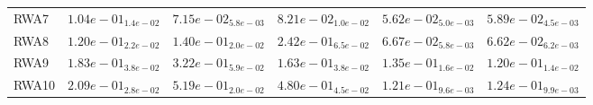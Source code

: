 \documentclass{article}
\begin{document}
\begin{table}
\begin{scriptsize}
\begin{tabular}{llllll}
RWA7 & $  1.04e-01_{ 1.4e-02}$ & $  7.15e-02_{ 5.8e-03}$ & $  8.21e-02_{ 1.0e-02}$ & \cellcolor{gray95}$  5.62e-02_{ 5.0e-03}$ & \cellcolor{gray25}$  5.89e-02_{ 4.5e-03}$ \\
RWA8 & $  1.20e-01_{ 2.2e-02}$ & $  1.40e-01_{ 2.0e-02}$ & $  2.42e-01_{ 6.5e-02}$ & \cellcolor{gray25}$  6.67e-02_{ 5.8e-03}$ & \cellcolor{gray95}$  6.62e-02_{ 6.2e-03}$ \\
RWA9 & $  1.83e-01_{ 3.8e-02}$ & $  3.22e-01_{ 5.9e-02}$ & $  1.63e-01_{ 3.8e-02}$ & \cellcolor{gray25}$  1.35e-01_{ 1.6e-02}$ & \cellcolor{gray95}$  1.20e-01_{ 1.4e-02}$ \\
RWA10 & $  2.09e-01_{ 2.8e-02}$ & $  5.19e-01_{ 2.0e-02}$ & $  4.80e-01_{ 4.5e-02}$ & \cellcolor{gray95}$  1.21e-01_{ 9.6e-03}$ & \cellcolor{gray25}$  1.24e-01_{ 9.9e-03}$ \\
\hline
\end{tabular}
\end{scriptsize}
\end{table}
\end{document}
